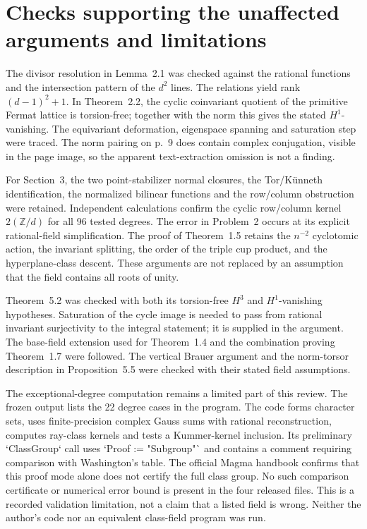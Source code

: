 \documentclass[10pt]{article}
\begin{document}
\section*{Checks supporting the unaffected arguments and limitations}
The divisor resolution in Lemma 2.1 was checked against the rational functions and the intersection pattern of the \(d^2\) lines. The relations yield rank \((d-1)^2+1\). In Theorem 2.2, the cyclic coinvariant quotient of the primitive Fermat lattice is torsion-free; together with the norm this gives the stated \(H^1\)-vanishing. The equivariant deformation, eigenspace spanning and saturation step were traced. The norm pairing on p. 9 does contain complex conjugation, visible in the page image, so the apparent text-extraction omission is not a finding.\par
For Section 3, the two point-stabilizer normal closures, the Tor/Künneth identification, the normalized bilinear functions and the row/column obstruction were retained. Independent calculations confirm the cyclic row/column kernel \(2(\mathbb{Z}/d)\) for all 96 tested degrees. The error in Problem 2 occurs at its explicit rational-field simplification. The proof of Theorem 1.5 retains the \(n^{-2}\) cyclotomic action, the invariant splitting, the order of the triple cup product, and the hyperplane-class descent. These arguments are not replaced by an assumption that the field contains all roots of unity.\par
Theorem 5.2 was checked with both its torsion-free \(H^3\) and \(H^1\)-vanishing hypotheses. Saturation of the cycle image is needed to pass from rational invariant surjectivity to the integral statement; it is supplied in the argument. The base-field extension used for Theorem 1.4 and the combination proving Theorem 1.7 were followed. The vertical Brauer argument and the norm-torsor description in Proposition 5.5 were checked with their stated field assumptions.\par
The exceptional-degree computation remains a limited part of this review. The frozen output lists the 22 degree cases in the program. The code forms character sets, uses finite-precision complex Gauss sums with rational reconstruction, computes ray-class kernels and tests a Kummer-kernel inclusion. Its preliminary `ClassGroup` call uses `Proof := "Subgroup"` and contains a comment requiring comparison with Washington’s table. The official Magma handbook confirms that this proof mode alone does not certify the full class group. No such comparison certificate or numerical error bound is present in the four released files. This is a recorded validation limitation, not a claim that a listed field is wrong. Neither the author’s code nor an equivalent class-field program was run.\par
\end{document}
